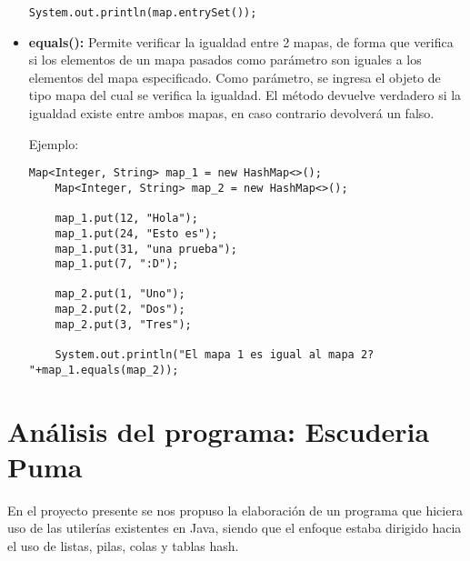 \documentclass[12pt, letterpaper]{article} %
\begin{document}
\begin{itemize}
\begin{lstlisting}[frame=single]
    System.out.println(map.entrySet());
    \end{lstlisting}

    \item \textbf{equals():} Permite verificar la igualdad entre 2 mapas, de forma que verifica si los elementos de un mapa pasados como parámetro son iguales a los elementos del mapa especificado. Como parámetro, se ingresa el objeto de tipo mapa del cual se verifica la igualdad. El método devuelve verdadero si la igualdad existe entre ambos mapas, en caso contrario devolverá un falso.
    
    Ejemplo:
    \lstset{language = Java, breaklines=true, basicstyle=\footnotesize}
    \begin{lstlisting}[frame=single]
    Map<Integer, String> map_1 = new HashMap<>();
    Map<Integer, String> map_2 = new HashMap<>();

    map_1.put(12, "Hola");
    map_1.put(24, "Esto es");
    map_1.put(31, "una prueba");
    map_1.put(7, ":D");

    map_2.put(1, "Uno");
    map_2.put(2, "Dos");
    map_2.put(3, "Tres");

    System.out.println("El mapa 1 es igual al mapa 2? "+map_1.equals(map_2));
    \end{lstlisting}
\end{itemize}
\vspace{80mm}

\section*{Análisis del programa: Escuderia Puma}

En el proyecto presente se nos propuso la elaboración de un programa que hiciera uso de las utilerías existentes en Java, siendo que el enfoque estaba dirigido hacia el uso de listas, pilas, colas y tablas hash.
\vspace{5mm} 
\end{document}
